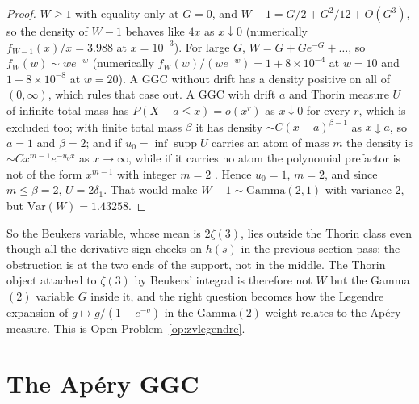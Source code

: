 \begin{proof}
$W\ge1$ with equality only at $G=0$, and $W-1=G/2+G^2/12+O(G^3)$, so the density of $W-1$ behaves like $4x$ as $x\downarrow0$ (numerically $f_{W-1}(x)/x=3.988$ at $x=10^{-3}$). For large $G$, $W=G+Ge^{-G}+\dots$, so $f_W(w)\sim we^{-w}$ (numerically $f_W(w)/(we^{-w})=1+8\times10^{-4}$ at $w=10$ and $1+8\times10^{-8}$ at $w=20$). A GGC without drift has a density positive on all of $(0,\infty)$, which rules that case out. A GGC with drift $a$ and Thorin measure $U$ of infinite total mass has $P(X-a\le x)=o(x^r)$ as $x\downarrow0$ for every $r$, which is excluded too; with finite total mass $\beta$ it has density $\sim C(x-a)^{\beta-1}$ as $x\downarrow a$, so $a=1$ and $\beta=2$; and if $u_0=\inf\operatorname{supp}U$ carries an atom of mass $m$ the density is $\sim Cx^{m-1}e^{-u_0x}$ as $x\to\infty$, while if it carries no atom the polynomial prefactor is not of the form $x^{m-1}$ with integer $m=2$ \cite[Ch.~4]{bondesson1992}. Hence $u_0=1$, $m=2$, and since $m\le\beta=2$, $U=2\delta_1$. That would make $W-1\sim\mathrm{Gamma}(2,1)$ with variance $2$, but $\mathrm{Var}(W)=1.43258$. 
\end{proof}

So the Beukers variable, whose mean is $2\zeta(3)$, lies outside the Thorin class even though all the derivative sign checks on $h(s)$ in the previous section pass; the obstruction is at the two ends of the support, not in the middle. The Thorin object attached to $\zeta(3)$ by Beukers' integral is therefore not $W$ but the Gamma$(2)$ variable $G$ inside it, and the right question becomes how the Legendre expansion of $g\mapsto g/(1-e^{-g})$ in the Gamma$(2)$ weight relates to the Ap\'ery measure. This is Open Problem~\ref{op:zvlegendre}.

\section{The Ap\'ery GGC}

